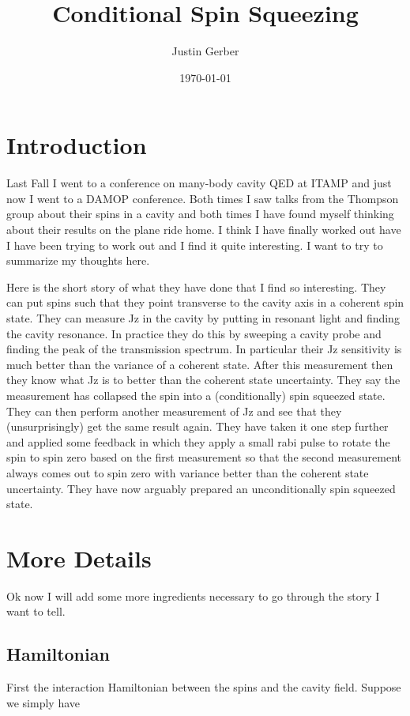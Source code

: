 \documentclass[12pt]{article}
\begin{document}
\title{Conditional Spin Squeezing}
\author{Justin Gerber}
\date{\today}
\maketitle

\section{Introduction}
Last Fall I went to a conference on many-body cavity QED at ITAMP and just now I went to a DAMOP conference. Both times I saw talks from the Thompson group about their spins in a cavity and both times I have found myself thinking about their results on the plane ride home. I think I have finally worked out have I have been trying to work out and I find it quite interesting. I want to try to summarize my thoughts here.

Here is the short story of what they have done that I find so interesting. They can put spins such that they point transverse to the cavity axis in a coherent spin state. They can measure Jz in the cavity by putting in resonant light and finding the cavity resonance. In practice they do this by sweeping a cavity probe and finding the peak of the transmission spectrum. In particular their Jz sensitivity is much better than the variance of a coherent state. After this measurement then they know what Jz is to better than the coherent state uncertainty. They say the measurement has collapsed the spin into a (conditionally) spin squeezed state. They can then perform another measurement of Jz and see that they (unsurprisingly) get the same result again. They have taken it one step further and applied some feedback in which they apply a small rabi pulse to rotate the spin to spin zero based on the first measurement so that the second measurement always comes out to spin zero with variance better than the coherent state uncertainty. They have now arguably prepared an unconditionally spin squeezed state.

\section{More Details}

Ok now I will add some more ingredients necessary to go through the story I want to tell. 

\subsection{Hamiltonian}
First the interaction Hamiltonian between the spins and the cavity field. Suppose we simply have
\end{document}
